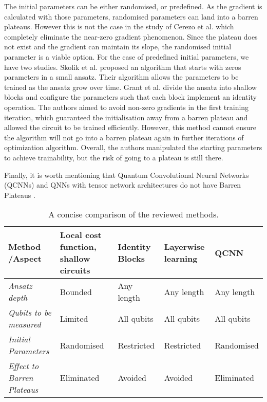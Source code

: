 The initial parameters can be either randomised, or predefined.
As the gradient is calculated with those parameters, randomised parameters can land into a barren plateaus.
However this is not the case in the study of Cerezo et al. which completely eliminate the near-zero gradient phenomenon.
Since the plateau does not exist and the gradient can maintain its slope, the randomised initial parameter is a viable option.
For the case of predefined initial parameters, we have two studies.
Skolik et al. \cite{skolikLayerwiseLearningQuantum2021} proposed an algorithm that starts with zeros parameters in a small ansatz.
Their algorithm allows the parameters to be trained as the ansatz grow over time.
Grant et al. \cite{grantInitializationStrategyAddressing2019} divide the ansatz into shallow blocks and configure the parameters such that each block implement an identity operation.
The authors aimed to avoid non-zero gradients in the first training iteration, which guaranteed the initialisation away from a barren plateau and allowed the circuit to be trained efficiently.
However, this method cannot ensure the algorithm will not go into a barren plateau again in further iterations of optimization algorithm.
Overall, the authors manipulated the starting parameters to achieve trainability, but the risk of going to a plateau is still there.

Finally, it is worth mentioning that Quantum Convolutional Neural Networks (QCNNs) and QNNs with tensor network architectures do not have Barren Plateaus \cite{congQuantumConvolutionalNeural2019}.

\begin{table*}[]
    \centering
    \begin{tabular}{||p{3cm} p{2cm} p{2cm} p{2cm} p{2cm}||}
        \hline
        \textbf{Method /\newline Aspect}             & \textbf{Local cost function, shallow circuits} & \textbf{Identity Blocks} & \textbf{Layerwise learning} & \textbf{QCNN} \\
        \hline \hline
        \raggedright\emph{Ansatz depth}              & Bounded                                        & Any length               & Any length                  & Any length    \\
        \raggedright\emph{Qubits to be measured}     & Limited                                        & All qubits               & All qubits                  & All qubits    \\
        \raggedright\emph{Initial Parameters}        & Randomised                                     & Restricted               & Restricted                  & Randomised    \\
        \hline \hline
        \raggedright\emph{Effect to Barren Plateaus} & Eliminated                                     & Avoided                  & Avoided                     & Eliminated    \\
        \hline
    \end{tabular}
    \caption{A concise comparison of the reviewed methods.}
    \label{quick comparison of methods}
\end{table*}
